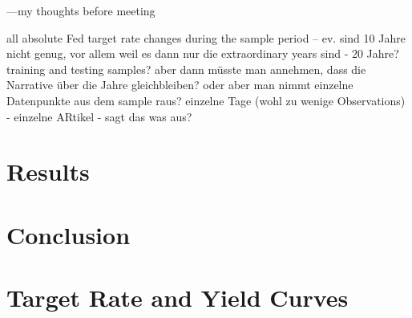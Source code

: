 \documentclass[11pt,a4paper,english,oneside]{book}
\numberwithin{equation}{chapter}
\begin{document}
---my thoughts before meeting

all absolute Fed target rate changes during the sample period -- ev. sind 10 Jahre nicht genug, vor allem weil es dann nur die extraordinary years sind - 20 Jahre? training and testing samples? aber dann müsste man annehmen, dass die Narrative über die Jahre gleichbleiben? oder aber man nimmt einzelne Datenpunkte aus dem sample raus? einzelne Tage (wohl zu wenige Observations) - einzelne ARtikel - sagt das was aus?


\chapter{Results}

\chapter{Conclusion}


\newpage

{} 





\newpage

\appendix
\noappendicestocpagenum
\addappheadtotoc



\renewcommand{\theequation}{A.\arabic{equation}}


\chapter{Target Rate and Yield Curves}\label{AppendixA}
\vspace{-0.5cm}
\end{document}
